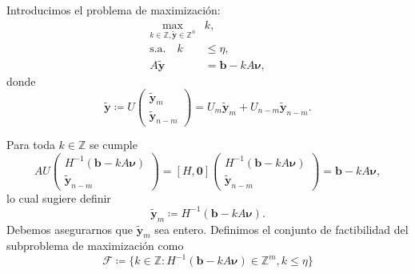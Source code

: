 \documentclass[aspectratio=169,professionalfonts]{beamer}
\newcommand{\Z}{\mathbb{Z}}
\renewcommand{\vec}[1]{\boldsymbol{#1}}
\newcommand{\inv}[1]{#1^{-1}}
\newcommand{\braces}[1]{\lbrace #1 \rbrace}
\newcommand{\tvec}[1]{\vec{\tilde{#1}}}
\begin{document}
\begin{frame}
	Introducimos el problema de maximización:
	\begin{subequations}
		\begin{align*}
			\max_{k \in \Z, \tvec{y} \in \Z^n}
				& k, \\
			\text{s.a.} \quad
			k &\leq \eta, \\
				A\tvec{y} &= \vec{b} - kA\vec{\nu},
		\end{align*}
	\end{subequations}
	donde
	\begin{equation*}
		\tvec{y} \coloneq U \begin{pmatrix} \tvec{y}_m \\ \tvec{y}_{n-m} \end{pmatrix}
		= U_m\tvec{y}_m + U_{n-m}\tvec{y}_{n-m}.
	\end{equation*}
\end{frame}

\begin{frame}
	Para toda $k \in \Z$ se cumple
	\begin{equation*}
		AU \begin{pmatrix} \inv{H}\left(\vec{b} - kA\vec{\nu}\right) \\ \tvec{y}_{n-m} \end{pmatrix}
		=
		[H, \vec{0}] \begin{pmatrix} \inv{H}\left(\vec{b} - kA\vec{\nu}\right) \\ \tvec{y}_{n-m} \end{pmatrix}
		= \vec{b} - kA\vec{\nu},
	\end{equation*}
	lo cual sugiere definir
	\begin{equation*}
		\tvec{y}_m \coloneq \inv{H}(\vec{b} - kA\vec{\nu}).
	\end{equation*}
	Debemos asegurarnos que $\tvec{y}_m$ sea entero. Definimos el conjunto de
	factibilidad del subproblema de maximización como
	\begin{equation*}
		\mathcal{F} \coloneq \braces{
			k \in \Z \colon \inv{H}\left(\vec{b} - kA\vec{\nu}\right) \in \Z^m, k \leq \eta
		}
	\end{equation*}
\end{frame}
\end{document}
